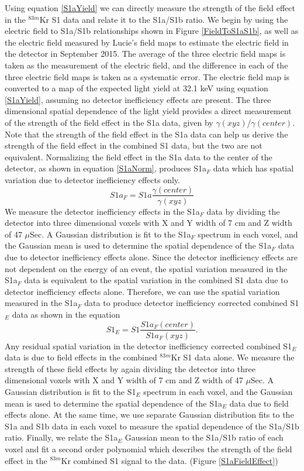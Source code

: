 \documentclass[a4paper,12pt]{article}
\begin{document}
{Using equation \ref{S1aYield} we can directly measure the strength of the field effect in the $^{83m}$Kr S1 data and relate it to the S1a/S1b ratio.  We begin by using the electric field to S1a/S1b relationships shown in Figure \ref{FieldToS1aS1b}, as well as the electric field measured by Lucie's field maps to estimate the electric field in the detector in September 2015.  The average of the three electric field maps is taken as the measurement of the electric field, and the difference in each of the three electric field maps is taken as a systematic error.  The electric field map is converted to a map of the expected light yield at 32.1 keV using equation \ref{S1aYield}, assuming no detector inefficiency effects are present. The three dimensional spatial dependence of the light yield provides a direct measurement of the strength of the field effect in the S1a data, given by $\gamma(xyz)$/$\gamma(center)$.  Note that the strength of the field effect in the S1a data can help us derive the strength of the field effect in the combined S1 data, but the two are not equivalent.  Normalizing the field effect in the S1a data to the center of the detector, as shown in equation \ref{S1aNorm}, produces S1a$_F$ data which has spatial variation due to detector inefficiency effects only.  
\begin{equation}
S1a_F = S1a \frac{\gamma(center)}{\gamma(xyz)}
\label{S1aNorm}
\end{equation}
We measure the detector inefficiency effects in the S1a$_F$ data by dividing the detector into three dimensional voxels with X and Y width of 7 cm and Z width of 47 $\mu$Sec.  A Gaussian distribution is fit to the S1a$_F$ spectrum in each voxel, and the Gaussian mean is used to determine the spatial dependence of the S1a$_F$ data due to detector inefficiency effects alone.  Since the detector inefficiency effects are not dependent on the energy of an event, the spatial variation measured in the S1a$_F$ data is equivalent to the spatial variation in the combined S1 data due to detector inefficiency effects alone.  Therefore, we can use the spatial variation measured in the S1a$_F$ data to produce detector inefficiency corrected combined S1$_E$ data as shown in the equation
\begin{equation}
S1_E= S1 \frac{S1a_F(center)}{S1a_F(xyz)}.
\end{equation}
Any residual spatial variation in the detector inefficiency corrected combined S1$_E$ data is due to field effects in the combined $^{83m}$Kr S1 data alone.  We measure the strength of these field effects by again dividing the detector into three dimensional voxels with X and Y width of 7 cm and Z width of 47 $\mu$Sec.  A Gaussian distribution is fit to the S1$_E$ spectrum in each voxel, and the Gaussian mean is used to determine the spatial dependence of the S1a$_E$ data due to field effects alone.  At the same time, we use separate Gaussian distribution fits to the S1a and S1b data in each voxel to measure the spatial dependence of the S1a/S1b ratio.  Finally, we relate the S1a$_E$ Gaussian mean to the S1a/S1b ratio of each voxel and fit a second order polynomial which describes the strength of the field effect in the $^{83m}$Kr combined S1 signal to the data. (Figure \ref{S1aFieldEffect}) 


}
\end{document}
